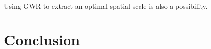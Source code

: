 Using GWR to extract an optimal spatial scale is also a possibility.




\section{Conclusion}








 

















